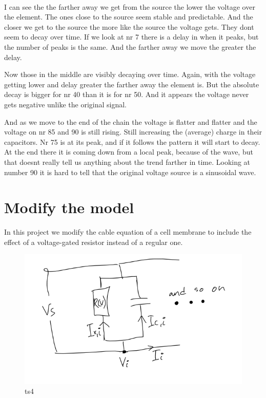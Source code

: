 \documentclass[11pt]{article}
\begin{document}
    \begin{center}
    \end{center}
    { \hspace*{\fill} \\}
    
    I can see the the farther away we get from the source the lower the
voltage over the element. The ones close to the source seem stable and
predictable. And the closer we get to the source the more like the
source the voltage gets. They dont seem to decay over time. If we look
at nr 7 there is a delay in when it peaks, but the number of peaks is
the same. And the farther away we move the greater the delay.

Now those in the middle are visibly decaying over time. Again, with the
voltage getting lower and delay greater the farther away the element is.
But the absolute decay is bigger for nr 40 than it is for nr 50. And it
appears the voltage never gets negative unlike the original signal.

And as we move to the end of the chain the voltage is flatter and
flatter and the voltage on nr 85 and 90 is still rising. Still
increasing the (average) charge in their capacitors. Nr 75 is at its
peak, and if it follows the pattern it will start to decay. At the end
there it is coming down from a local peak, because of the wave, but that
doesnt really tell us anything about the trend farther in time. Looking
at number 90 it is hard to tell that the original voltage source is a
sinusoidal wave.

    \hypertarget{modify-the-model}{%
\section{Modify the model}\label{modify-the-model}}

    In this project we modify the cable equation of a cell membrane to
include the effect of a voltage-gated resistor instead of a regular one.

    \begin{figure}
\centering
\includegraphics{pics/Task4sys.png}
\caption{ts4}
\end{figure}
\end{document}
